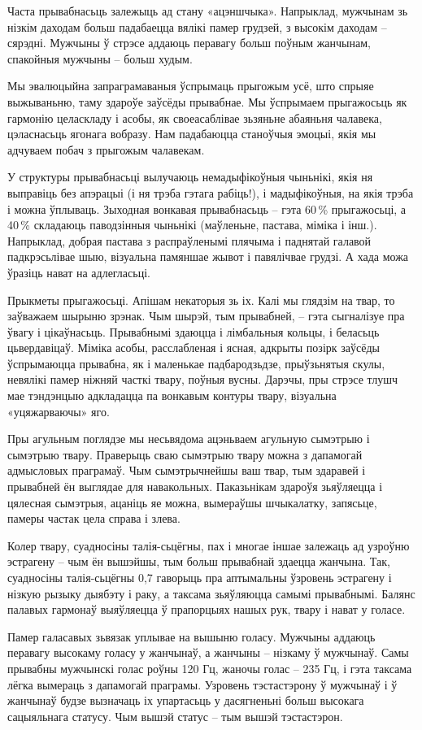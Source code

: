 Часта прывабнасьць залежыць ад стану «ацэншчыка». Напрыклад, мужчынам зь нізкім даходам больш падабаецца вялікі памер грудзей, з высокім даходам – сярэдні. Мужчыны ў стрэсе аддаюць перавагу больш поўным жанчынам, спакойныя мужчыны – больш худым.

Мы эвалюцыйна запраграмаваныя ўспрымаць прыгожым усё, што спрыяе выжываньню, таму здароўе заўсёды прывабнае. Мы ўспрымаем прыгажосьць як гармонію целаскладу і асобы, як своеасаблівае зьзяньне абаяньня чалавека, цэласнасьць ягонага вобразу. Нам падабаюцца станоўчыя эмоцыі, якія мы адчуваем побач з прыгожым чалавекам.

У структуры прывабнасьці вылучаюць немадыфікоўныя чыньнікі, якія ня выправіць без апэрацыі (і ня трэба гэтага рабіць!), і мадыфікоўныя, на якія трэба і можна ўплываць. Зыходная вонкавая прывабнасьць – гэта 60\,\% прыгажосьці, а 40\,\% складаюць паводзінныя чыньнікі (маўленьне, пастава, міміка і інш.). Напрыклад, добрая пастава з распраўленымі плячыма і паднятай галавой падкрэсьлівае шыю, візуальна памяншае жывот і павялічвае грудзі. А хада можа ўразіць нават на адлегласьці.

Прыкметы прыгажосьці. Апішам некаторыя зь іх. Калі мы глядзім на твар, то заўважаем шырыню зрэнак. Чым шырэй, тым прывабней, – гэта сыгналізуе пра ўвагу і цікаўнасьць. Прывабнымі здаюцца і лімбальныя кольцы, і беласьць цьвердавіцаў. Міміка асобы, расслабленая і ясная, адкрыты позірк заўсёды ўспрымаюцца прывабна, як і маленькае падбародзьдзе, прыўзьнятыя скулы, невялікі памер ніжняй часткі твару, поўныя вусны. Дарэчы, пры стрэсе тлушч мае тэндэнцыю адкладацца па вонкавым контуры твару, візуальна «уцяжарваючы» яго.

Пры агульным поглядзе мы несьвядома ацэньваем агульную сымэтрыю і сымэтрыю твару. Праверыць сваю сымэтрыю твару можна з дапамогай адмысловых праграмаў. Чым сымэтрычнейшы ваш твар, тым здаравей і прывабней ён выглядае для навакольных. Паказьнікам здароўя зьяўляецца і цялесная сымэтрыя, ацаніць яе можна, вымераўшы шчыкалатку, запясьце, памеры частак цела справа і злева.

Колер твару, суадносіны талія-сьцёгны, пах і многае іншае залежаць ад узроўню эстрагену – чым ён вышэйшы, тым больш прывабнай здаецца жанчына. Так, суадносіны талія-сьцёгны 0,7 гаворыць пра аптымальны ўзровень эстрагену і нізкую рызыку дыябэту і раку, а таксама зьяўляюцца самымі прывабнымі. Балянс палавых гармонаў выяўляецца ў прапорцыях нашых рук, твару і нават у голасе.

Памер галасавых зьвязак уплывае на вышыню голасу. Мужчыны аддаюць перавагу высокаму голасу у жанчынаў, а жанчыны – нізкаму ў мужчынаў. Самы прывабны мужчынскі голас роўны 120 Гц, жаночы голас – 235 Гц, і гэта таксама лёгка вымераць з дапамогай праграмы. Узровень тэстастэрону ў мужчынаў і ў жанчынаў будзе вызначаць іх упартасьць у дасягненьні больш высокага сацыяльнага статусу. Чым вышэй статус – тым вышэй тэстастэрон.

